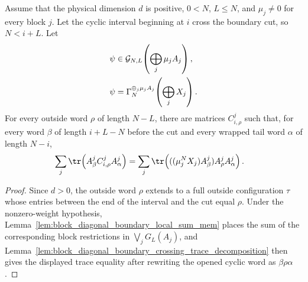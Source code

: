 \begin{lemma}
    \label{lem:block_diagonal_boundary_crossing_trace_decomposition_boundary}
    \leanok
    Assume that the physical dimension $d$ is positive, $0<N$, $L\le N$, and
    $\mu_j\ne0$ for every block $j$. Let the cyclic interval beginning at $i$
    cross the boundary cut, so $N<i+L$. Let
    \begin{align}
        \psi
         & \in
        \mathcal G_{N,L}\!\left(\bigoplus_j\mu_jA_j\right),
        \notag \\
        \psi
         & =
        \Gamma_N^{\oplus_j\mu_jA_j}\!\left(\bigoplus_jX_j\right).
        \notag
    \end{align}
    For every outside word $\rho$ of length $N-L$, there are matrices
    $C^j_{i,\rho}$ such that, for every word $\beta$ of length $i+L-N$ before
    the cut and every wrapped tail word $\alpha$ of length $N-i$,
    \begin{align}
        \sum_j\tr\!\left(A^j_\beta C^j_{i,\rho}A^j_\alpha\right)
         & =
        \sum_j\tr\!\left(((\mu_j^NX_j)A^j_\beta)A^j_\rho A^j_\alpha\right).
        \notag
    \end{align}
\end{lemma}

\begin{proof}
    \leanok
    Since $d>0$, the outside word $\rho$ extends to a full outside configuration
    $\tau$ whose entries between the end of the interval and the cut equal
    $\rho$. Under the nonzero-weight hypothesis,
    Lemma~\ref{lem:block_diagonal_boundary_local_sum_mem} places the
    sum of the corresponding block restrictions in $\bigvee_jG_L(A_j)$, and
    Lemma~\ref{lem:block_diagonal_boundary_crossing_trace_decomposition} then gives
    the displayed trace equality after rewriting the opened cyclic word as
    $\beta\rho\alpha$.
\end{proof}

